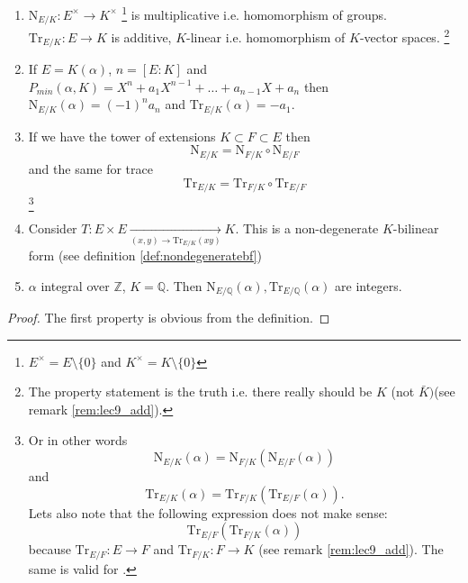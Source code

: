 \begin{property}
  \begin{enumerate}
  \item $\mathrm{N}_{E/K}: E^\times \to K^\times$
    \footnote{
      $E^\times = E \setminus \{0\}$ and
      $K^\times = K \setminus \{0\}$
    }
    is multiplicative
    i.e. homomorphism of groups.
    $\mathrm{Tr}_{E/K}: E \to K$ is additive, $K$-linear
    i.e. homomorphism of $K$-vector spaces.
    \footnote{
      The property statement is the truth i.e.
      there really should be $K$ (not $\bar{K})$(see remark
      \ref{rem:lec9_add}).
    }    
  \item If $E=K\left(\alpha\right)$, $n = \left[E:K\right]$ and
    $P_{min}\left(\alpha, K\right) = X^n + a_1 X^{n-1} + \dots +
    a_{n-1} X + a_{n}$ then $\mathrm{N}_{E/K}\left(\alpha\right) = (-1)^n
    a_n$ and $\mathrm{Tr}_{E/K}\left(\alpha\right) = -a_1$.
  \item If we have the tower of extensions $K \subset F \subset E$
    then
    \[
    \mathrm{N}_{E/K} =
    \mathrm{N}_{F/K} \circ
    \mathrm{N}_{E/F}
    \]
    and the same for trace
    \[
    \mathrm{Tr}_{E/K} =
    \mathrm{Tr}_{F/K} \circ
    \mathrm{Tr}_{E/F}
    \]
    \footnote{      
      Or in other words
      \[
      \mathrm{N}_{E/K}\left(\alpha\right) =
      \mathrm{N}_{F/K} \left(
      \mathrm{N}_{E/F}\left(\alpha\right)
      \right)
      \]
      and
      \[
      \mathrm{Tr}_{E/K}\left(\alpha\right) =
      \mathrm{Tr}_{F/K} \left(
      \mathrm{Tr}_{E/F}\left(\alpha\right)
      \right).
      \]
      Lets also note \cite{bib:KeithConradTraceNorm2} that the
      following expression does not make sense:
      \[
      \mathrm{Tr}_{E/F} \left(
      \mathrm{Tr}_{F/K}\left(\alpha\right)\right)
      \]
      because $\mathrm{Tr}_{E/F}: E \to F$ and
      $\mathrm{Tr}_{F/K}: F \to K$ (see remark
      \ref{rem:lec9_add}).
      The same is valid for .  
    }
    \item Consider $T: E \times E \xrightarrow[(x, y) \to
      \mathrm{Tr}_{E/K}\left(xy\right)  ]{} K$. This is a
      non-degenerate $K$-bilinear form (see
      definition \ref{def:nondegeneratebf}) 
    \item $\alpha$ integral over $\mathbb{Z}$, $K = \mathbb{Q}$. Then
      $\mathrm{N}_{E/\mathbb{Q}}\left(\alpha\right),
      \mathrm{Tr}_{E/\mathbb{Q}}\left(\alpha\right)$ are integers.
  \end{enumerate}
  \begin{proof}
    The first property is obvious from the definition.

\end{proof}
\end{property}
